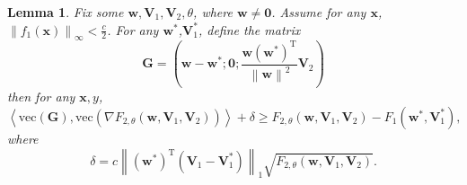 \documentclass{article}
\theoremstyle{plain}
\newtheorem{lem}{Lemma}
\theoremstyle{definition}
\newcommand{\norm}[1]{\left\lVert#1\right\rVert}
\newcommand{\iprod}[2]{\left\langle #1,#2 \right\rangle}
\begin{document}
\begin{lem}
    Fix some $\mathbf{w},\mathbf{V}_1,\mathbf{V}_2,\theta$,
    where $\mathbf{w}\neq\mathbf{0}$.
    Assume for any $\mathbf{x}$, $\norm{f_1(\mathbf{x})}_\infty<\frac c 2$.
    For any $\mathbf{w}^*$,$\mathbf{V}_1^*$, define the matrix
    \[\mathbf{G}=
    \left(\mathbf{w}-\mathbf{w}^*;
    \mathbf{0};
    \frac{\mathbf{w}\left(\mathbf{w}^{*}\right)^\mathrm{T}}{\norm{\mathbf{w}}^2}\mathbf{V}_2\right)\]
    then for any $\mathbf{x},y$,
    \begin{equation}\label{lemma1}
    \iprod{\text{vec}(\mathbf{G})}
    {\text{vec}\left(\nabla F_{2,\theta}(\mathbf{w},\mathbf{V}_1,\mathbf{V}_2)\right)}
    +\delta
    \geq F_{2,\theta}(\mathbf{w},\mathbf{V}_1,\mathbf{V}_2)
    -F_1(\mathbf{w}^*,\mathbf{V}_1^*),
    \end{equation}
    where
    \[\delta=c\norm{\left(\mathbf{w}^*\right)^\mathrm{T}\left(\mathbf{V}_1-\mathbf{V}_1^*\right)}_1
    \sqrt{F_{2,\theta}(\mathbf{w},\mathbf{V}_1,\mathbf{V}_2)}.\]
\end{lem}
\end{document}
